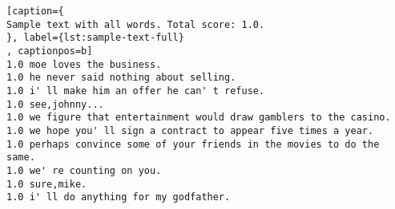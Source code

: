 
\begin{lstlisting}[caption={
Sample text with all words. Total score: 1.0.
}, label={lst:sample-text-full}
, captionpos=b]
1.0	moe loves the business.
1.0	he never said nothing about selling.
1.0	i' ll make him an offer he can' t refuse.
1.0	see,johnny...
1.0	we figure that entertainment would draw gamblers to the casino.
1.0	we hope you' ll sign a contract to appear five times a year.
1.0	perhaps convince some of your friends in the movies to do the same.
1.0	we' re counting on you.
1.0	sure,mike.
1.0	i' ll do anything for my godfather.
\end{lstlisting}


